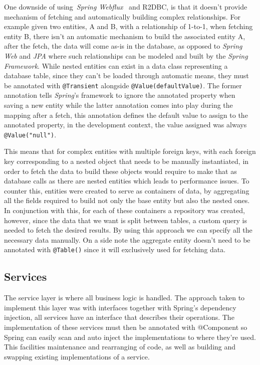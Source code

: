 One downside of using~\textit{Spring Webflux}~\cite{spring-webflux} and R2DBC, is that it doesn't provide mechanism of fetching and automatically building complex relationships. For example given two entities, A and B, with a relationship of 1-to-1, when fetching entity B, there isn't an automatic mechanism to build the associated entity A, after the fetch, the data will come as-is in the database, as opposed to \textit{Spring Web} and \textit{JPA} where such relationships can be modeled and built by the \textit{Spring Framework}. 
While nested entities can exist in a data class representing a database table, since they can't be loaded through automatic means, they must be annotated with \texttt{@Transient} alongside \texttt{@Value(defaultValue)}. 
The former annotation tells \textit{Spring}'s framework to ignore the annotated property when saving a new entity while the latter annotation comes into play during the mapping after a fetch, this annotation defines the default value to assign to the annotated property, in the development context, the value assigned was always \texttt{@Value("null")}. 

This means that for complex entities with multiple foreign keys, with each foreign key corresponding to a nested object that needs to be manually instantiated, in order to fetch the data to build these objects would require to make that as database calls as there are nested entities which leads to performance issues. To counter this, entities were created to serve as containers of data, by aggregating all the fields required to build not only the base entity but also the nested ones. 
In conjunction with this, for each of these containers a repository was created, however, since the data that we want is split between tables, a custom query is needed to fetch the desired results. By using this approach we can specify all the necessary data manually. On a side note the aggregate entity doesn't need to be annotated with \texttt{@Table()} since it will exclusively used for fetching data.


\subsection{Services}

The service layer is where all business logic is handled. The approach taken to implement this layer was with interfaces together with Spring's dependency injection, all services have an interface that describes their operations. The implementation of these services must then be annotated with @Component so Spring can easily scan and auto inject the implementations to where they're used. This facilities maintenance and rearranging of code, as well as building and swapping existing implementations of a service.

